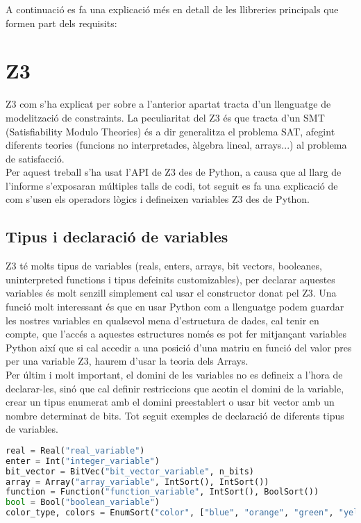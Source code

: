 A continuació es fa una explicació més en detall de les llibreries principals que formen part dels requisits:

\section{Z3}
Z3 com s'ha explicat per sobre a l'anterior apartat tracta d'un llenguatge de modelització de constraints. La peculiaritat del Z3 és que tracta d'un SMT (Satisfiability Modulo Theories) és a dir generalitza el problema SAT, afegint diferents teories (funcions no interpretades, àlgebra lineal, arrays...) al problema de satisfacció.\\

Per aquest treball s'ha usat l'API de Z3 des de Python, a causa que al llarg de l'informe s'exposaran múltiples talls de codi, tot seguit es fa una explicació de com s'usen els operadors lògics i defineixen variables Z3 des de Python.

\subsection{Tipus i declaració de variables}
Z3 té molts tipus de variables (reals, enters, arrays, bit vectors, booleanes, uninterpreted functions i tipus defeinits customizables), per declarar aquestes variables és molt senzill simplement cal usar el constructor donat pel Z3. Una funció molt interessant és que en usar Python com a llenguatge podem guardar les nostres variables en qualsevol mena d'estructura de dades, cal tenir en compte, que l'accés a aquestes estructures només es pot fer mitjançant variables Python així que si cal accedir a una posició d'una matriu en funció del valor pres per una variable Z3, haurem d'usar la teoria dels Arrays.\\
Per últim i molt important, el domini de les variables no es defineix a l'hora de declarar-les, sinó que cal definir restriccions que acotin el domini de la variable, crear un tipus enumerat amb el domini preestablert o usar bit vector amb un nombre determinat de bits.
Tot seguit exemples de declaració de diferents tipus de variables.

\begin{lstlisting}[language=Python, caption=Declaració de variables]
real = Real("real_variable")
enter = Int("integer_variable")
bit_vector = BitVec("bit_vector_variable", n_bits)
array = Array("array_variable", IntSort(), IntSort())
function = Function("function_variable", IntSort(), BoolSort())
bool = Bool("boolean_variable")
color_type, colors = EnumSort("color", ["blue", "orange", "green", "yellow", "red"])
\end{lstlisting}

